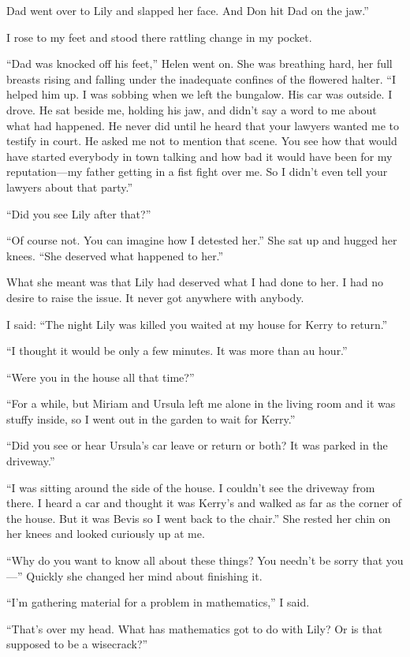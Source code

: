 \documentclass{novel}
\begin{document}
Dad went over to Lily and slapped her face. And Don hit Dad on the jaw.”

I rose to my feet and stood there rattling change in my pocket.

“Dad was knocked off his feet,” Helen went on. She was breathing hard, her full breasts rising and falling under the inadequate confines of the flowered halter. “I helped him up. I was sobbing when we left the bungalow. His car was outside. I drove. He sat beside me, holding his jaw, and didn’t say a word to me about what had happened. He never did until he heard that your lawyers wanted me to testify in court. He asked me not to mention that scene. You see how that would have started everybody in town talking and how bad it would have been for my reputation—my father getting in a fist fight over me. So I didn’t even tell your lawyers about that party.”

“Did you see Lily after that?”

“Of course not. You can imagine how I detested her.” She sat up and hugged her knees. “She deserved what happened to her.”

What she meant was that Lily had deserved what I had done to her. I had no desire to raise the issue. It never got anywhere with anybody.

I said: “The night Lily was killed you waited at my house for Kerry to return.”

“I thought it would be only a few minutes. It was more than au hour.”

“Were you in the house all that time?”

“For a while, but Miriam and Ursula left me alone in the living room and it was stuffy inside, so I went out in the garden to wait for Kerry.”

“Did you see or hear Ursula’s car leave or return or both? It was parked in the driveway.”

“I was sitting around the side of the house. I couldn’t see the driveway from there. I heard a car and thought it was Kerry’s and walked as far as the corner of the house. But it was Bevis so I went back to the chair.” She rested her chin on her knees and looked curiously up at me. 

“Why do you want to know all about these things? You needn’t be sorry that you—” Quickly she changed her mind about finishing it.

“I’m gathering material for a problem in mathematics,” I said.

“That’s over my head. What has mathematics got to do with Lily? Or is that supposed to be a wisecrack?”
\end{document}
